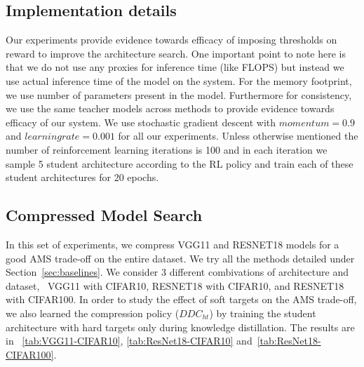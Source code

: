 \documentclass[../main]{subfiles}
\begin{document}
    \subsection{Implementation details}
        \label{sec:ID}
        Our experiments provide evidence towards efficacy of imposing thresholds on reward to improve the architecture search.
        One important point to note here is that we do not use any proxies for inference time (like FLOPS) but instead we use actual inference time of the model on the system.
        For the memory footprint, we use number of parameters present in the model.
        Furthermore for consistency, we use the same teacher models across methods to provide evidence towards efficacy of our system.
        We use stochastic gradient descent with $momentum = 0.9 $ and $learning rate = 0.001$ for all our experiments.
        Unless otherwise mentioned the number of reinforcement learning iterations is 100 and in each iteration we sample 5 student architecture according to the RL policy and train each of these student architectures for 20 epochs.
    
    \subsection{Compressed Model Search}
        \label{sec:full-model-search}
        
        
        
        In this set of experiments, we compress VGG11 and RESNET18 models for a good AMS trade-off on the entire dataset.
        We try all the methods detailed under Section~\ref{sec:baselines}.
        We consider 3 different combivations of architecture and dataset, \viz~VGG11 with CIFAR10, RESNET18 with CIFAR10, and RESNET18 with CIFAR100.
        In order to study the effect of soft targets on the AMS trade-off, we also learned the compression policy ($DDC_{ht}$) by training the student architecture with hard targets only during knowledge distillation.
        The results are in \tablesname~\ref{tab:VGG11-CIFAR10}, \ref{tab:ResNet18-CIFAR10} and~\ref{tab:ResNet18-CIFAR100}.
        
\end{document}
